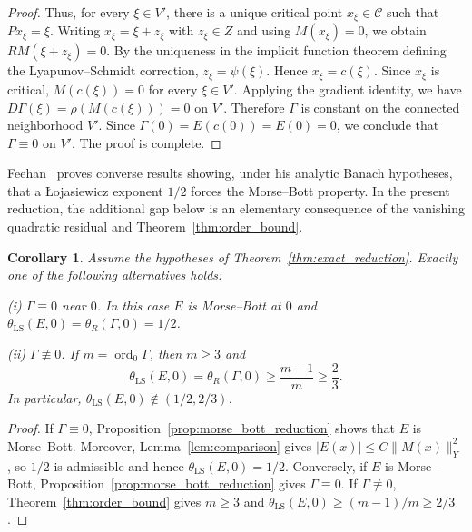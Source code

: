 \documentclass[11pt]{article}
\newtheorem{corollary}[theorem]{Corollary}
\theoremstyle{definition}
\theoremstyle{remark}
\begin{document}
\begin{proof}
\medskip
Thus, for every $\xi \in V'$, there is a unique critical point $x_\xi \in \mathcal{C}$ such that
$P x_\xi = \xi$. Writing $x_\xi=\xi+z_\xi$ with $z_\xi\in Z$ and using $M(x_\xi)=0$, we obtain $RM(\xi+z_\xi)=0$.
By the uniqueness in the implicit function theorem defining the Lyapunov--Schmidt correction,
$z_\xi = \psi(\xi)$. Hence $x_\xi = c(\xi)$. Since $x_\xi$ is critical,
$M(c(\xi)) = 0$ for every $\xi \in V'$.
Applying the gradient identity, we have $D\Gamma(\xi) = \rho(M(c(\xi))) = 0$
on $V'$. Therefore $\Gamma$ is constant on the connected neighborhood $V'$. Since
$\Gamma(0) = E(c(0)) = E(0) = 0$, we conclude that
$\Gamma \equiv 0$ on $V'$. The proof is complete.
\end{proof}



Feehan~\cite[Theorems~1 and~2]{Feehan2020} proves converse results showing, under his analytic Banach hypotheses, that a \L{}ojasiewicz exponent $1/2$ forces the Morse--Bott property. In the present reduction, the additional gap below is an elementary consequence of the vanishing quadratic residual and Theorem~\ref{thm:order_bound}.


\begin{corollary} \label{cor:order_bound}
Assume the hypotheses of Theorem~\ref{thm:exact_reduction}. Exactly one of the following alternatives holds:

\smallskip
\noindent\textnormal{(i)} \quad $\Gamma\equiv0$ near $0$. In this case $E$ is Morse--Bott at $0$ and
$\theta_{\mathrm{LS}}(E,0)=\theta_R(\Gamma,0)=1/2$.

\smallskip
\noindent\textnormal{(ii)} \quad $\Gamma\not\equiv0$. If $m=\operatorname{ord}_0\Gamma$, then
$m\ge3$ and
$$
\theta_{\mathrm{LS}}(E,0)=\theta_R(\Gamma,0)\ge\frac{m-1}{m}\ge\frac23.
$$
In particular, $\theta_{\mathrm{LS}}(E,0)\notin(1/2,2/3)$.
\end{corollary}

\begin{proof}
If $\Gamma\equiv0$, Proposition~\ref{prop:morse_bott_reduction} shows that $E$ is Morse--Bott. Moreover,
Lemma~\ref{lem:comparison} gives $|E(x)|\le C\|M(x)\|_Y^2$, so $1/2$ is admissible and hence
$\theta_{\mathrm{LS}}(E,0)=1/2$. Conversely, if $E$ is Morse--Bott, Proposition~\ref{prop:morse_bott_reduction}
gives $\Gamma\equiv0$. If $\Gamma\not\equiv0$, Theorem~\ref{thm:order_bound} gives
$m\ge3$ and $\theta_{\mathrm{LS}}(E,0)\ge(m-1)/m\ge2/3$.
\end{proof}
\end{document}
